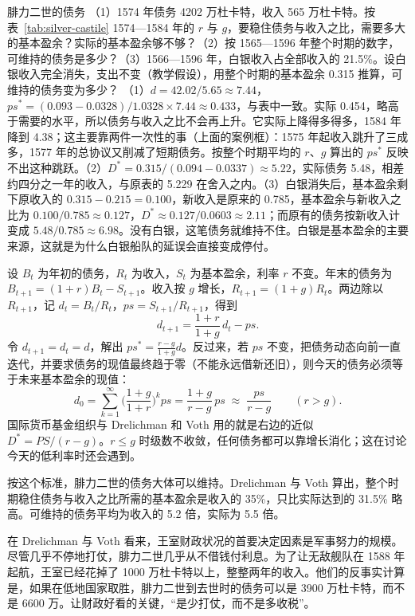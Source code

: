 \begin{example}{腓力二世的债务}\label{ex:silver-debt}
（1）1574 年债务 4202 万杜卡特，收入 565 万杜卡特。按表~\ref{tab:silver-castile} 1574—1584 年的 $r$ 与 $g$，要稳住债务与收入之比，需要多大的基本盈余？实际的基本盈余够不够？（2）按 1565—1596 年整个时期的数字，可维持的债务是多少？（3）1566—1596 年，白银收入占全部收入的 21.5\%。设白银收入完全消失，支出不变（教学假设），用整个时期的基本盈余 0.315 推算，可维持的债务变为多少？
\solution （1）$d=42.02/5.65\approx7.44$，$ps^{*}=(0.093-0.0328)/1.0328\times7.44\approx0.433$，与表中一致。实际 0.454，略高于需要的水平，所以债务与收入之比不会再上升。它实际上降得多得多，1584 年降到 4.38；这主要靠两件一次性的事（上面的案例框）：1575 年起收入跳升了三成多，1577 年的总协议又削减了短期债务。按整个时期平均的 $r$、$g$ 算出的 $ps^{*}$ 反映不出这种跳跃。（2）$D^{*}=0.315/(0.094-0.0337)\approx5.22$，实际债务 5.48，相差约四分之一年的收入，与原表的 5.229 在舍入之内。（3）白银消失后，基本盈余剩下原收入的 $0.315-0.215=0.100$，新收入是原来的 0.785，基本盈余与新收入之比为 $0.100/0.785\approx0.127$，$D^{*}\approx0.127/0.0603\approx2.11$；而原有的债务按新收入计变成 $5.48/0.785\approx6.98$。没有白银，这笔债务就维持不住。白银是基本盈余的主要来源，这就是为什么白银船队的延误会直接变成停付。
\end{example}

\begin{deeper}[债务动态与可维持的债务]
设 $B_t$ 为年初的债务，$R_t$ 为收入，$S_t$ 为基本盈余，利率 $r$ 不变。年末的债务为 $B_{t+1}=(1+r)B_t-S_{t+1}$。收入按 $g$ 增长，$R_{t+1}=(1+g)R_t$。两边除以 $R_{t+1}$，记 $d_t=B_t/R_t$，$ps=S_{t+1}/R_{t+1}$，得到
\[
d_{t+1}=\frac{1+r}{1+g}\,d_t-ps .
\]
令 $d_{t+1}=d_t=d$，解出 $ps^{*}=\frac{r-g}{1+g}d$。反过来，若 $ps$ 不变，把债务动态向前一直迭代，并要求债务的现值最终趋于零（不能永远借新还旧），则今天的债务必须等于未来基本盈余的现值：
\[
d_0=\sum_{k=1}^{\infty}\Big(\frac{1+g}{1+r}\Big)^{k}ps=\frac{1+g}{r-g}\,ps\;\approx\;\frac{ps}{r-g}\qquad(r>g).
\]
国际货币基金组织与 Drelichman 和 Voth 用的就是右边的近似 $D^{*}=PS/(r-g)$。$r\le g$ 时级数不收敛，任何债务都可以靠增长消化；这在讨论今天的低利率时还会遇到。
\end{deeper}

按这个标准，腓力二世的债务大体可以维持。Drelichman 与 Voth 算出，整个时期稳住债务与收入之比所需的基本盈余是收入的 35\%，只比实际达到的 31.5\% 略高。可维持的债务平均为收入的 5.2 倍，实际为 5.5 倍\cite{dv2010}。

在 Drelichman 与 Voth 看来，王室财政状况的首要决定因素是军事努力的规模。尽管几乎不停地打仗，腓力二世几乎从不借钱付利息\cite{dv2010}。为了让无敌舰队在 1588 年起航，王室已经花掉了 1000 万杜卡特以上，整整两年的收入\cite{dv2010}。他们的反事实计算是，如果在低地国家取胜，腓力二世到去世时的债务可以是 3900 万杜卡特，而不是 6600 万。让财政好看的关键，“是少打仗，而不是多收税”\cite{dv2010}。

